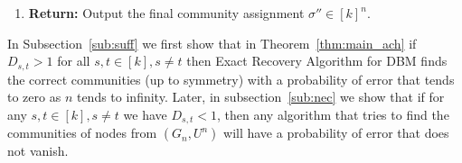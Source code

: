 \documentclass[11pt]{article}
\theoremstyle{plain}
\theoremstyle{definition}
\begin{document}
\begin{enumerate}
\begin{itemize}
        \item If \( (s,t) \notin \mathcal{S} \), use:
        \[
        \Pr\{ \mathbf{d}(v), L(v) \mid H = s \} \cdot p_s > \Pr\{ \mathbf{d}(v), L(v) \mid H = t \} \cdot p_t \quad \Rightarrow \quad H \neq t
        \]
    \end{itemize}
    
    \item \textbf{Return:} Output the final community assignment \( \sigma'' \in [k]^n \).
\end{enumerate}

In Subsection~\ref{sub:suff} we first show that in Theorem~\ref{thm:main_ach} if $D_{s,t} > 1$ for all $s,t \in [k], s \neq t$ then {\sc Exact Recovery Algorithm for DBM} finds the correct communities (up to symmetry) with a probability of error that tends to zero as $n$ tends to infinity. Later, in subsection~\ref{sub:nec} we show that if for any $s,t \in [k], s \neq t$ we have $D_{s,t} < 1$,  then any algorithm that tries to find the communities of nodes from $(G_n,U^n)$ will have a probability of error that does not vanish.
\end{document}
